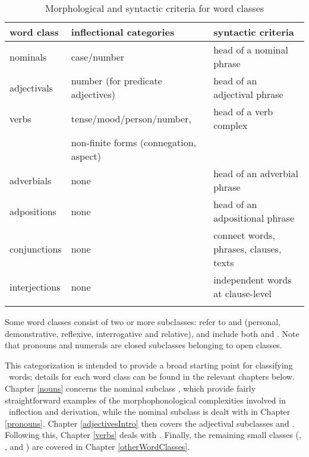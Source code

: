 \begin{table}[htb]\centering
\caption[Morphological and syntactic criteria for word classes]{Morphological and syntactic criteria for word classes}\label{wordClassSummary1}
\begin{tabular}[l]{l p{130pt} p{130pt}}\mytoprule
{word class}	&{inflectional categories}		&{syntactic criteria}		\\\hline
nominals		&case/number					&head of a nominal phrase	\\
adjectivals		&number (for predicate adjectives)	&head of an adjectival phrase	\\%
verbs		&tense/mood/person/number,		&head of a verb complex	\\%
			&non-finite forms (connegation, aspect)&					\\
adverbials		& none							&head of an adverbial phrase	\\
adpositions	& none							&head of an adpositional phrase	\\
conjunctions	& none							&connect words, phrases, clauses, texts	\\
interjections	& none							&independent words at clause-level	\\\mybottomrule
\end{tabular}
\end{table}


Some word classes consist of two or more subclasses: 
 refer to  %
and  (personal, demonstrative, reflexive, interrogative and relative), and  include both  and . %
Note that pronouns and numerals are closed subclasses belonging to open classes.

This categorization is intended to provide a broad starting point for classifying \PS\ words; details for each word class can be found in the relevant chapters below. 
Chapter \ref{nouns} concerns the nominal subclass , which provide fairly straightforward examples of the morphophonological complexities involved in \PS\ inflection and derivation, while 
the nominal subclass  is dealt with in Chapter \ref{pronouns}. %
Chapter \ref{adjectivesIntro} then covers the adjectival subclasses  and . Following this, Chapter \ref{verbs} deals with . Finally, the remaining small classes (, ,  %
and ) are covered in Chapter \ref{otherWordClasses}. 











%